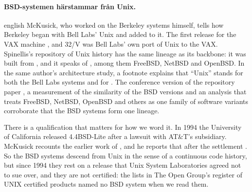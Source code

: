 \paragraph{%
  {BSD-systemen härstammar från Unix.}} %
\begin{onlyin}{english} %
McKusick, who worked on the Berkeley systems himself, tells how Berkeley
began with Bell Labs' Unix and added to it.
The first release for the VAX machine
, and 32/V was
Bell Labs' own port of Unix to the VAX.
Spinellis's repository of Unix history has the same lineage as its
backbone: it was built from , and it speaks of
, among them
FreeBSD, NetBSD and OpenBSD.
In the same author's architecture study, a footnote explains that
\enquote{Unix} stands for both the Bell Labs systems and for
.
The conference version of the repository paper%
\autocite{Spinellis2015Repository}, a measurement of the similarity of
the BSD versions%
\autocite{Yamamoto2005Measuring} and an analysis that treats
FreeBSD, NetBSD, OpenBSD and others as one family of software
variants\autocite{Tenev2012Bioinformatics} corroborate that the BSD
systems form one lineage.

There is a qualification that matters for how we word it.
In 1994 the University of California released 4.4BSD-Lite after a
lawsuit with AT\&T's subsidiary.
McKusick recounts the earlier work of
,
and he reports that after the settlement
.
So the BSD systems descend from Unix in the sense of a continuous code
history, but since 1994 they rest on a release that Unix System
Laboratories agreed not to sue over, and they are not certified: the
lists in The Open Group's register of UNIX certified products named no
BSD system when we read them.
\end{onlyin}
